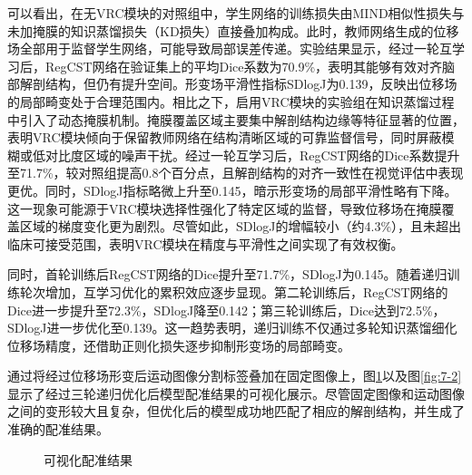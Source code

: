 可以看出，在无VRC模块的对照组中，学生网络的训练损失由MIND相似性损失与未加掩膜的知识蒸馏损失（KD损失）直接叠加构成。此时，教师网络生成的位移场全部用于监督学生网络，可能导致局部误差传递。实验结果显示，经过一轮互学习后，RegCST网络在验证集上的平均Dice系数为70.9\%，表明其能够有效对齐脑部解剖结构，但仍有提升空间。形变场平滑性指标SDlogJ为0.139，反映出位移场的局部畸变处于合理范围内。相比之下，启用VRC模块的实验组在知识蒸馏过程中引入了动态掩膜机制。掩膜覆盖区域主要集中解剖结构边缘等特征显著的位置，表明VRC模块倾向于保留教师网络在结构清晰区域的可靠监督信号，同时屏蔽模糊或低对比度区域的噪声干扰。经过一轮互学习后，RegCST网络的Dice系数提升至71.7\%，较对照组提高0.8个百分点，且解剖结构的对齐一致性在视觉评估中表现更优。同时，SDlogJ指标略微上升至0.145，暗示形变场的局部平滑性略有下降。这一现象可能源于VRC模块选择性强化了特定区域的监督，导致位移场在掩膜覆盖区域的梯度变化更为剧烈。尽管如此，SDlogJ的增幅较小（约4.3\%），且未超出临床可接受范围，表明VRC模块在精度与平滑性之间实现了有效权衡。

同时，首轮训练后RegCST网络的Dice提升至71.7\%，SDlogJ为0.145。随着递归训练轮次增加，互学习优化的累积效应逐步显现。第二轮训练后，RegCST网络的Dice进一步提升至72.3\%，SDlogJ降至0.142；第三轮训练后，Dice达到72.5\%，SDlogJ进一步优化至0.139。这一趋势表明，递归训练不仅通过多轮知识蒸馏细化位移场精度，还借助正则化损失逐步抑制形变场的局部畸变。

通过将经过位移场形变后运动图像分割标签叠加在固定图像上，图\ref{fig:7-1}以及图\ref{fig:7-2}显示了经过三轮递归优化后模型配准结果的可视化展示。尽管固定图像和运动图像之间的变形较大且复杂，但优化后的模型成功地匹配了相应的解剖结构，并生成了准确的配准结果。

\begin{figure}[h]
    \centering
    \caption{可视化配准结果}
    \label{fig:7-1}
\end{figure}



